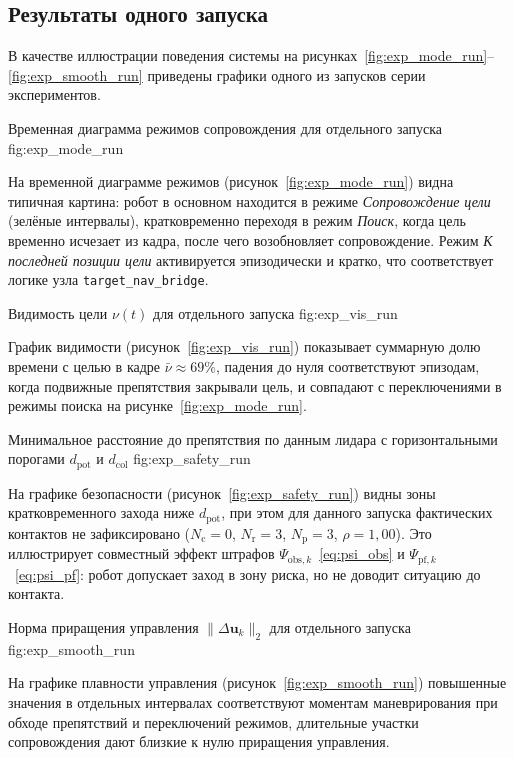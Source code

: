 \subsection{Результаты одного запуска}

В качестве иллюстрации поведения системы на
рисунках~\ref{fig:exp_mode_run}--\ref{fig:exp_smooth_run} приведены
графики одного из запусков серии экспериментов.

{Временная диаграмма режимов сопровождения для отдельного запуска}
{fig:exp_mode_run}

На временной диаграмме режимов
(рисунок~\ref{fig:exp_mode_run}) видна типичная картина: робот в
основном находится в режиме \textit{Сопровождение цели} (зелёные
интервалы), кратковременно переходя в режим \textit{Поиск}, когда
цель временно исчезает из кадра, после чего возобновляет
сопровождение. Режим \textit{К последней позиции цели} активируется
эпизодически и кратко, что соответствует логике узла
\texttt{target\_nav\_bridge}.

{Видимость цели $\nu(t)$ для отдельного запуска}
{fig:exp_vis_run}

График видимости (рисунок~\ref{fig:exp_vis_run}) показывает суммарную
долю времени с целью в кадре $\bar{\nu} \approx 69\%$, падения до
нуля соответствуют эпизодам, когда подвижные препятствия закрывали
цель, и совпадают с переключениями в режимы поиска на
рисунке~\ref{fig:exp_mode_run}.

{Минимальное расстояние до препятствия по данным лидара
с горизонтальными порогами $d_{\text{pot}}$ и $d_{\text{col}}$}
{fig:exp_safety_run}

На графике безопасности (рисунок~\ref{fig:exp_safety_run}) видны
зоны кратковременного захода ниже $d_{\text{pot}}$, при этом для
данного запуска фактических контактов не зафиксировано
($N_{\text{c}}=0$, $N_{\text{r}}=3$, $N_{\text{p}}=3$, $\rho=1{,}00$).
Это иллюстрирует совместный эффект штрафов
$\Psi_{\text{obs},k}$~\eqref{eq:psi_obs} и
$\Psi_{\text{pf},k}$~\eqref{eq:psi_pf}: робот допускает заход в зону
риска, но не доводит ситуацию до контакта.

{Норма приращения управления $\|\Delta\mathbf{u}_k\|_2$ для отдельного запуска}
{fig:exp_smooth_run}

На графике плавности управления (рисунок~\ref{fig:exp_smooth_run})
повышенные значения в отдельных интервалах соответствуют моментам
маневрирования при обходе препятствий и переключений режимов,
длительные участки сопровождения дают близкие к нулю приращения
управления.

